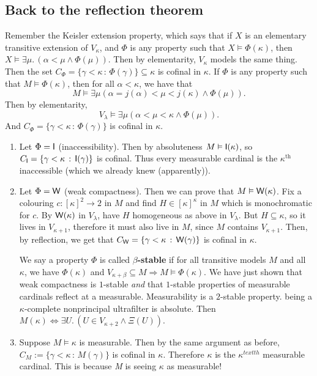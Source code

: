\documentclass{article}
\begin{document}
\subsection{Back to the reflection theorem}
Remember the Keisler extension property, which says that if $X$ is an elementary transitive extension of $V_{\kappa}$, and $\Phi$ is any property such that $X \models \Phi(\kappa)$, then $X \models \exists \mu.\, (\alpha < \mu \wedge \Phi(\mu))$. Then by elementarity, $V_{\kappa}$ models the same thing. Then the set $C_{\Phi} = \{ \gamma < \kappa\, : \, \Phi(\gamma)\} \subseteq \kappa$ is cofinal in $\kappa$. \gap 
If $\Phi$ is any property such that $M \models \Phi(\kappa)$, then for all $\alpha < \kappa$, we have that \[ M \models \exists \mu (\alpha = j(\alpha) < \mu < j(\kappa) \wedge \Phi(\mu)).\]
Then by elementarity, \[ V_{\lambda} \models \exists \mu ( \alpha < \mu < \kappa \wedge \Phi(\mu)).\]
And $C_{\Phi} = \{\gamma < \kappa \, : \, \Phi(\gamma)\}$ is cofinal in $\kappa$.
\begin{exs*}\hspace{0.1cm}
    \begin{enumerate}
        \item Let $\Phi = \mathsf{I}$ (inaccessibility). Then by absoluteness $M \vDash \mathsf{I}(\kappa)$, so $C_{\mathsf{I}} = \{ \gamma < \kappa \, : \, \mathsf{I}(\gamma)\}$ is cofinal. Thus every measurable cardinal is the $\kappa^{\text{th}}$ inaccessible (which we already knew (apparently)).
        \item Let $\Phi = \mathsf{W}$ (weak compactness). Then we can prove that $M \vDash \mathsf{W}(\kappa)$. Fix a colouring $c : [\kappa]^{2} \to 2$ in $M$ and find $H \in [\kappa]^{\kappa}$ in $M$ which is monochromatic for $c$. By $\mathsf{W}(\kappa)$ in $V_{\lambda}$, have $H$ homogeneous as above in $V_{\lambda}$. But $H \subseteq \kappa$, so it lives in $V_{\kappa+1}$, therefore it must also live in $M$, since $M$ contains $V_{\kappa+1}$. \gap 
        Then, by reflection, we get that $C_{\mathsf{W}} = \{ \gamma < \kappa \, : \, \mathsf{W}(\gamma)\}$ is cofinal in $\kappa$.
        \begin{remark*}
            We say a property $\Phi$ is called $\beta$\textbf{-stable} if for all transitive models $M$ and all $\kappa$, we have $\Phi(\kappa)$ and $V_{\kappa+\beta} \subseteq M \Rightarrow M \models \Phi(\kappa)$. We have just shown that weak compactness is $1$-stable \textit{and} that $1$-stable properties of measurable cardinals reflect at a measurable. Measurability is a $2$-stable property. being a $\kappa$-complete nonprincipal ultrafilter is absolute. Then $M(\kappa) \Leftrightarrow \exists U. \, (U \in V_{\kappa+2} \wedge \Xi(U))$.
        \end{remark*}
        \item Suppose $M \models \kappa$ is measurable. Then by the same argument as before, $C_{M} := \{ \gamma < \kappa\, : \, M(\gamma)\}$ is cofinal in $\kappa$. Therefore $\kappa$ is the $\kappa^{text{th}}$ measurable cardinal. This is because \textit{M} is seeing $\kappa$ as measurable!
    \end{enumerate}
\end{exs*}
\end{document}
